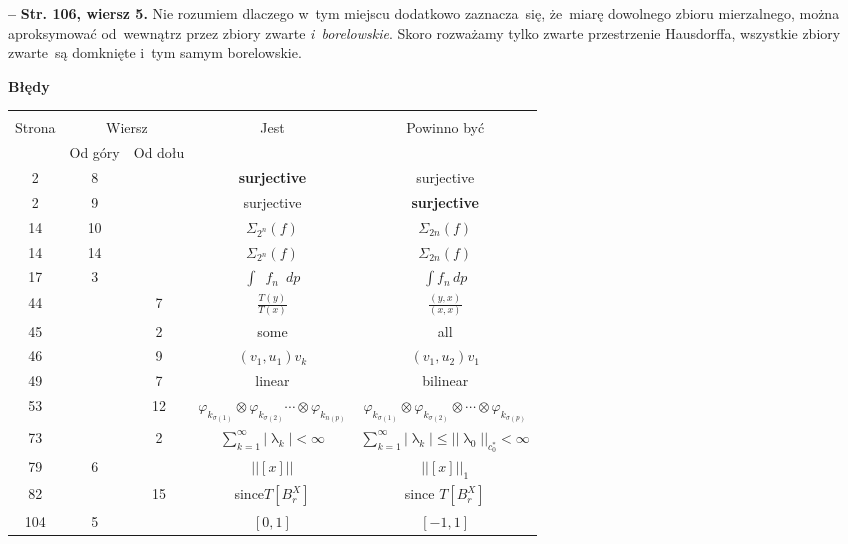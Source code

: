 \documentclass[a4paper,11pt]{article}
\newcommand{\fr}{\frac}
\newcommand{\la}{\uplambda}
\newcommand{\vp}{\varphi}
\newcommand{\si}{\sigma}
\newcommand{\Si}{\Sigma}
\newcommand{\ot}{\otimes}
\newcommand{\Sum}{\sum\limits}
\newcommand{\Int}{\int\limits}
\newcommand{\IntCaD}[2] { \Int #1 \, d#2 } %
\providecommand{\absj}[1]{\lvert #1 \rvert}
\newcommand{\norm}[1]{\left|\left| #1 \right|\right|}
\newcommand{\tb}{\textbf}
\newcommand{\noi}{\noindent}
\newcommand{\start}{\noi \tb{--} {}}
\newcommand{\StrWg}[2]{\tb{Str. #1, wiersz #2.}}
\newcommand{\Center}[1]{\begin{center} #1 \end{center}}
\newcommand{\CenterTB}[1]{\Center{\tb{#1}}}
\begin{document}
\start \StrWg{106}{5} Nie rozumiem dlaczego w~tym miejscu dodatkowo
zaznacza~się, że~miarę dowolnego zbioru mierzalnego, można
aproksymować od~wewnątrz przez zbiory zwarte \emph{i~borelowskie}.
Skoro rozważamy tylko zwarte przestrzenie Hausdorffa, wszystkie zbiory
zwarte~są domknięte i~tym samym borelowskie.

\newpage



\CenterTB{Błędy}
\begin{center}
  \begin{tabular}{|c|c|c|c|c|}
    \hline
    & \multicolumn{2}{c|}{} & & \\
    Strona & \multicolumn{2}{c|}{Wiersz}& Jest & Powinno być \\ \cline{2-3}
    & Od góry & Od dołu &  &  \\ \hline
    2 & 8 & & \tb{surjective} & surjective \\
    2 & 9 & & surjective & \tb{surjective} \\
    14 & 10 & & $\Si_{ 2^{ n } }( f )$ & $\Si_{ 2 n }( f )$ \\
    14 & 14 & & $\Si_{ 2^{ n } }( f )$ & $\Si_{ 2 n }( f )$ \\
    17 & 3 & & $\int \;\: f_{ n } \;\: dp$ & $\IntCaD{ f_{ n } }{ p }$ \\
    44 & & 7 & $\fr{ T( y ) }{ T( x ) }$ & $\fr{ ( y, x ) }{ ( x, x ) }$ \\
    45 & & 2 & some & all \\
    46 & & 9 & $(v_{ 1 }, u_{ 1 } ) v_{ k }$ & $(v_{ 1 }, u_{ 2 } )
                                               v_{ 1 }$ \\
    49 & & 7 & linear & bilinear \\
    53 & & 12 & $\vp_{ k_{ \si( 1 ) } } \ot \vp_{ k_{ \si( 2 ) } } \cdots
                \ot \vp_{ k_{ n( p ) } }$
           & $\vp_{ k_{ \si( 1 ) } } \ot \vp_{ k_{ \si( 2 ) } } \ot \cdots
             \ot \vp_{ k_{ \si( p ) } }$ \\
    73 & & 2 & $\Sum_{ k = 1 }^{ \infty } \absj{ \la_{ k } } < \infty$
           & $\Sum_{ k = 1 }^{ \infty } \absj{ \la_{ k } } \leq
             \norm{ \la_{ 0 } }_{ c_{ 0 }^{ * } } < \infty$ \\
    79 & 6 & & $\norm{ [x] }$ & $\norm{ [x] }_{ 1 }$ \\
    82 & & 15 & since$T[ B_{ r }^{ X } ]$ & since $T[ B_{ r }^{ X } ]$ \\
    104 & 5 & & $[ 0, 1 ]$ & $[ -1, 1 ]$ \\

\end{tabular}
\end{center}
\end{document}
